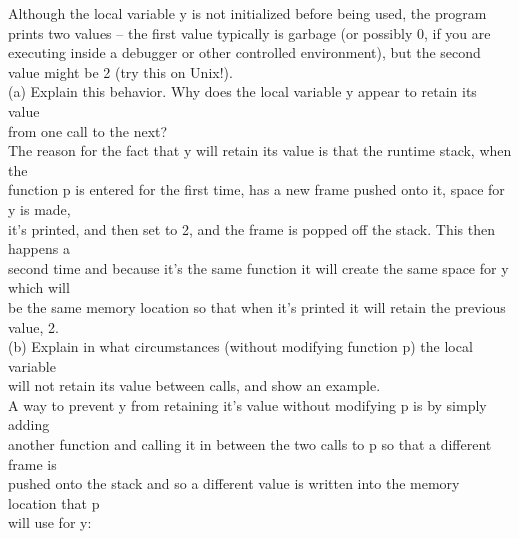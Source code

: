 \documentclass[12pt]{article}
\begin{document}
\begin{flushleft}
Although the local variable {\selectfont y} is not initialized before being used, the program prints two values – the first value typically is garbage (or possibly 0, if you are executing inside a debugger or other controlled environment), but the second value might be 2 (try this on
Unix!).\\
[2mm]

\qquad (a) Explain this behavior. Why does the local variable {\selectfont y} appear to retain its value\\
\qquad from one call to the next?\\
[2mm]

\qquad \qquad The reason for the fact that {\selectfont y} will retain its value is that the runtime stack, when the\\
\qquad \qquad function {\selectfont p} is entered for the first time, has a new frame pushed onto it, space for {\selectfont y} is made,\\
\qquad \qquad it's printed, and then set to 2, and the frame is popped off the stack.  This then happens a\\
\qquad \qquad second time and because it's the same function it will create the same space for {\selectfont y} which will\\
\qquad \qquad be the same memory location so that when it's printed it will retain the previous value, 2.\\
[2mm]

\qquad (b) Explain in what circumstances (without modifying function p) the local variable\\
 will not retain its value between calls, and show an example.\\
[2mm]

\qquad \qquad A way to prevent {\selectfont y} from retaining it's value without modifying {\selectfont p} is by simply adding\\
\qquad \qquad another function and calling it in between the two calls to {\selectfont p} so that a different frame is\\
\qquad \qquad pushed onto the stack and so a different value is written into the memory location that {\selectfont p}\\
\qquad \qquad will use for {\selectfont y}:\\
[2mm]


\end{flushleft}
\end{document}
